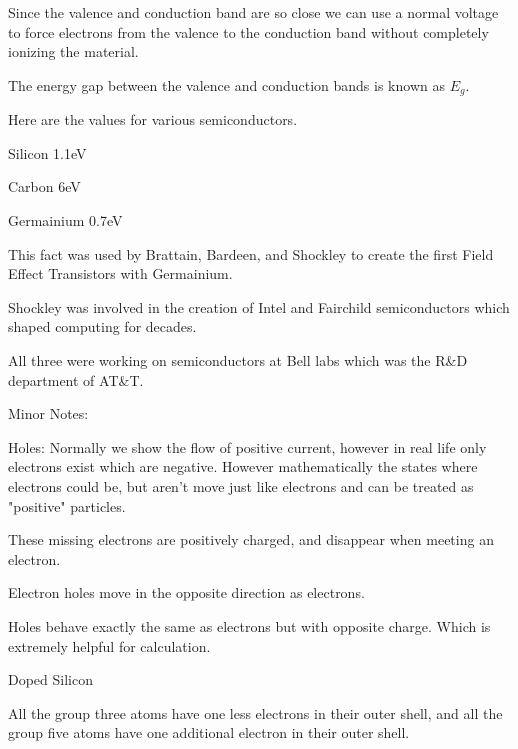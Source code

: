 \documentclass{report}
\begin{document}
\begin{description}
\begin{mdframed}
\begin{mdframed}
                Since the valence and conduction band
                are so close we can use a normal voltage to
                force electrons from the valence to the
                conduction band without completely
                ionizing the material.

                The energy gap between the valence
                and conduction bands is known as $E_g$.

                Here are the values for various
                semiconductors.

                Silicon 1.1eV

                Carbon 6eV

                Germainium 0.7eV
            \end{mdframed}

            This fact was used by Brattain, Bardeen,
            and Shockley to create the first
            Field Effect Transistors with Germainium.

            Shockley was involved in the creation of Intel
            and Fairchild semiconductors which shaped
            computing for decades.

            All three were working on semiconductors
            at Bell labs which was the R\&D department
            of AT\&T.

        \end{mdframed}
    \item Minor Notes:
        \begin{mdframed}
            Holes: Normally we show the flow of positive current,
            however in real life only electrons exist which are
            negative. However mathematically the states where electrons
            could be, but aren't move just like electrons and can
            be treated as "positive" particles.

            These missing electrons are positively charged, and disappear
            when meeting an electron.

            Electron holes move in the opposite direction as
            electrons.

            Holes behave exactly the same as electrons but
            with opposite charge. Which is extremely helpful
            for calculation.
        \end{mdframed}
    \item Doped Silicon
        \begin{mdframed}
            All the group three atoms have one less electrons
            in their outer shell, and all the group five
            atoms have one additional electron in their
            outer shell.


\end{mdframed}
\end{description}
\end{document}
